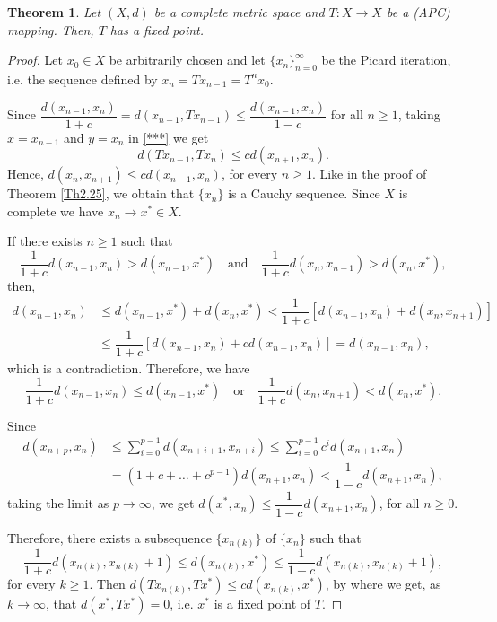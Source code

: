 \documentclass[10pt,a4paper]{amsart}
\newtheorem{theorem}{Theorem}
\begin{document}
	\begin{theorem}
		Let \((X,d)\) be a complete metric space and \(T : X \to X \) be a (APC) mapping. Then, \(T\) has a fixed point.
	\end{theorem}

	\begin{proof}
		Let \(x_0 \in X\) be arbitrarily chosen and let \(\{x_n\}_{n=0}^{\infty}\) be the Picard iteration, i.e. the sequence defined by \(x_n = Tx_{n-1} = T^nx_0\). 
		
		Since \(\dfrac{d(x_{n-1},x_n)}{1+c} = d(x_{n-1}, Tx_{n-1}) \leq \dfrac{d(x_{n-1},x_n)}{1-c}\) for all \(n \geq 1\), taking \(x=x_{n-1}\) and \(y=x_n\) in \ref{***} we get 
		\[d(Tx_{n-1},Tx_n) \leq c d(x_{n+1},x_n).\]
		Hence, \(d(x_n,x_{n+1}) \leq c d(x_{n-1},x_n)\), for every \(n \geq 1\). Like in the proof of Theorem \ref{Th2.25}, we obtain that \(\{x_n\}\) is a Cauchy sequence. Since \(X\) is complete we have \(x_n \to x^* \in X\).
		
		If there exists \(n\geq 1\) such that 
		\[\dfrac1{1+c}d(x_{n-1},x_n) > d(x_{n-1},x^*) \quad \text{and} \quad \dfrac1{1+c}d(x_{n},x_{n+1}) > d(x_{n},x^*),\]
		then,
		\begin{align*}
			d(x_{n-1},x_n) &\leq d(x_{n-1},x^*)+d(x_{n},x^*) < \dfrac1{1+c}[d(x_{n-1},x_n)+d(x_{n},x_{n+1})]\\
			&\leq \dfrac1{1+c}[d(x_{n-1},x_n)+cd(x_{n-1},x_n)] = d(x_{n-1},x_n),
		\end{align*}
		which is a contradiction. Therefore, we have
		\[\dfrac{1}{1+c}d(x_{n-1},x_n) \leq d(x_{n-1},x^*) \quad\text{or} \quad \dfrac1{1+c}d(x_{n},x_{n+1})< d(x_{n},x^*).\]
		
		Since 
		\begin{align*}
			d(x_{n+p}, x_{n}) &\leq \sum_{i=0}^{p-1} d(x_{n+i+1},x_{n+i}) \leq \sum_{i=0}^{p-1} c^{i} d(x_{n+1},x_{n})\\
			& =(1+c+\dots+c^{p-1}) d(x_{n+1},x_{n}) < \dfrac{1}{1-c} d(x_{n+1},x_{n}),
		\end{align*}
		taking the limit as \(p \to \infty\), we get \(d(x^*,x_n) \leq \dfrac{1}{1-c} d(x_{n+1},x_n)\), for all \(n \geq 0\).
		
		Therefore, there exists a subsequence \(\{x_{n(k)}\}\) of \(\{x_n\}\) such that 
		\[\dfrac1{1+c}d(x_{n(k)},x_{n(k)}+1) \leq d(x_{n(k)},x^*) \leq \dfrac{1}{1-c}d(x_{n(k)},x_{n(k)}+1),\]
		for every \(k \geq 1\). Then \(d(Tx_{n(k)},Tx^*) \leq c d(x_{n(k)},x^*)\), by where we get, as \(k\to \infty\), that \(d(x^*, Tx^*) = 0\), i.e. \(x^*\) is a fixed point of \(T\).
	\end{proof}
\end{document}
